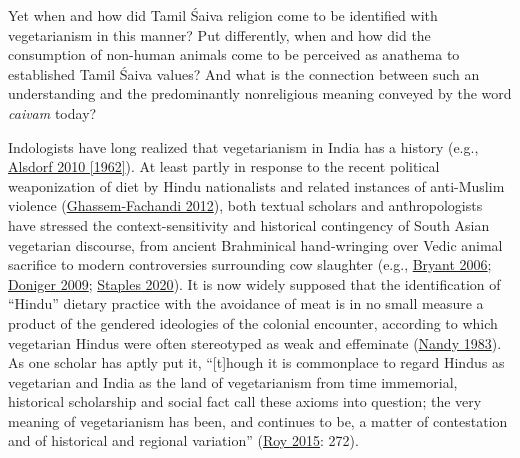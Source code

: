 Yet when and how did Tamil Śaiva religion come to be identified with vegetarianism in this manner? Put differently, when and how did the consumption of non-human animals come to be perceived as anathema to established Tamil Śaiva values? And what is the connection between such an understanding and the predominantly nonreligious meaning conveyed by the word \emph{caivam} today?


Indologists have long realized that vegetarianism in India has a history (e.g., \hyperref[Alsdorf2010]{Alsdorf 2010 [1962]}). At least partly in response to the recent political weaponization of diet by Hindu nationalists and related instances of anti-Muslim violence (\hyperref[GhassemFachandi2012]{Ghassem-Fachandi 2012}), both textual scholars and anthropologists have stressed the context-sensitivity and historical contingency of South Asian vegetarian discourse, from ancient Brahminical hand-wringing over Vedic animal sacrifice to modern controversies surrounding cow slaughter (e.g., \hyperref[Bryant2006]{Bryant 2006}; \hyperref[Doniger2009]{Doniger 2009}; \hyperref[Staples2020]{Staples 2020}). It is now widely supposed that the identification of “Hindu” dietary practice with the avoidance of meat is in no small measure a product of the gendered ideologies of the colonial encounter, according to which vegetarian Hindus were often stereotyped as weak and effeminate (\hyperref[Nandy1983]{Nandy 1983}). As one scholar has aptly put it, “[t]hough it is commonplace to regard Hindus as vegetarian and India as the land of vegetarianism from time immemorial, historical scholarship and social fact call these axioms into question; the very meaning of vegetarianism has been, and continues to be, a matter of contestation and of historical and regional variation” (\hyperref[Roy2015]{Roy 2015}: 272).


